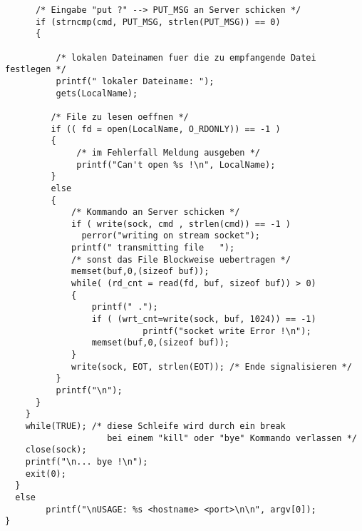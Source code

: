 \pagebreak

\begin{verbatim}
      /* Eingabe "put ?" --> PUT_MSG an Server schicken */
      if (strncmp(cmd, PUT_MSG, strlen(PUT_MSG)) == 0)
      {
 
          /* lokalen Dateinamen fuer die zu empfangende Datei festlegen */
          printf(" lokaler Dateiname: ");
          gets(LocalName);
 
         /* File zu lesen oeffnen */
         if (( fd = open(LocalName, O_RDONLY)) == -1 )
         {
              /* im Fehlerfall Meldung ausgeben */
              printf("Can't open %s !\n", LocalName);
         }
         else
         {
             /* Kommando an Server schicken */
             if ( write(sock, cmd , strlen(cmd)) == -1 )
               perror("writing on stream socket");
             printf(" transmitting file   ");
             /* sonst das File Blockweise uebertragen */
             memset(buf,0,(sizeof buf));
             while( (rd_cnt = read(fd, buf, sizeof buf)) > 0)
             {
                 printf(" .");
                 if ( (wrt_cnt=write(sock, buf, 1024)) == -1)
                           printf("socket write Error !\n");
                 memset(buf,0,(sizeof buf));
             }
             write(sock, EOT, strlen(EOT)); /* Ende signalisieren */
          }
          printf("\n");
      }
    }
    while(TRUE); /* diese Schleife wird durch ein break
                    bei einem "kill" oder "bye" Kommando verlassen */
    close(sock);
    printf("\n... bye !\n");
    exit(0);
  }
  else
        printf("\nUSAGE: %s <hostname> <port>\n\n", argv[0]);
}
\end{verbatim}

 
